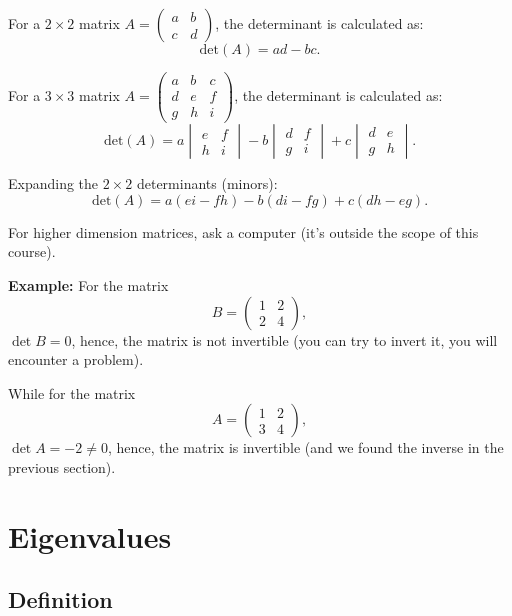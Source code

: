 \documentclass[]{article}
\begin{document}
	For a $2 \times 2$ matrix $A = \begin{pmatrix} a & b \\ c & d \end{pmatrix}$, the determinant is calculated as:
	$$
	\text{det}(A) = ad - bc.
	$$
	
	For a $3 \times 3$ matrix $A = \begin{pmatrix} a & b & c \\ d & e & f \\ g & h & i \end{pmatrix} $, the determinant is calculated as:
	$$
	\text{det}(A) =
	  a \begin{vmatrix} e & f \\ h & i \end{vmatrix}
	- b \begin{vmatrix} d & f \\ g & i \end{vmatrix}
	+ c \begin{vmatrix} d & e \\ g & h \end{vmatrix}.
	$$
	
	Expanding the $2 \times 2$ determinants (minors):
	$$
	\text{det}(A) = a(ei - fh) - b(di - fg) + c(dh - eg).
	$$
	
	For higher dimension matrices, ask a computer (it's outside the scope of this course).
	
	\noindent \textbf{Example:} For the matrix
	$$
	B = \begin{pmatrix} 1 & 2 \\ 2 & 4 \end{pmatrix},
	$$
	$\det{B} = 0$, hence, the matrix is not invertible (you can try to invert it, you will encounter a problem).
	
	While for the matrix
	$$
	A = \begin{pmatrix} 1 & 2 \\ 3 & 4 \end{pmatrix},
	$$
	$\det{A} = -2 \neq 0$, hence, the matrix is invertible (and we found the inverse in the previous section).
		
	\section{Eigenvalues}
	
	\subsection{Definition}
	
\end{document}
